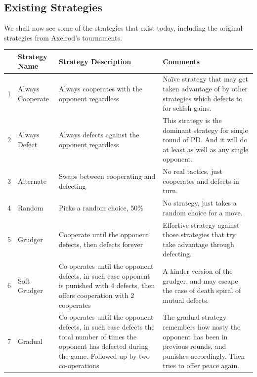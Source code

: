 \documentclass{icldt}
\numberwithin{equation}{section}       %
\begin{document}
\subsection{Existing Strategies}
\label{sect:Existing Strategies}
We shall now see some of the strategies that exist today, including the original strategies from Axelrod's tournaments.
\begin{center}
    \begin{tabular}{ | l | p{2.5cm} | p{4cm} | p{6cm} |}
    \hline
    & \textbf{Strategy Name} & \textbf{Strategy Description} & \textbf{Comments} \\ \hline
    1 & Always Cooperate & Always cooperates with the opponent regardless & Naïve strategy that may get taken advantage of by other strategies which defects to for selfish gains. \\ \hline
    2 & Always Defect	& Always defects against the opponent regardless	& This strategy is the dominant strategy for single round of PD. And it will do at least as well as any single opponent. \\ \hline
    3	& Alternate & Swaps between cooperating and defecting	& No real tactics, just cooperates and defects in turn.\\ \hline
4	& Random	& Picks a random choice, 50\%	& No strategy, just takes a random choice for a move.\\ \hline
5	& Grudger	& Cooperate until the opponent defects, then defects forever	& Effective strategy against those strategies that try take advantage through defecting.\\ \hline
6	& Soft Grudger	& Co-operates until the opponent defects, in such case opponent is punished with 4 defects, then offers cooperation with 2 cooperates	 & A kinder version of the grudger, and may escape the case of death spiral of mutual defects.\\ \hline
7	& Gradual	& Co-operates until the opponent defects, in such case defects the total number of times the opponent has defected during the game. Followed up by two co-operations & The gradual strategy remembers how nasty the opponent has been in previous rounds, and punishes accordingly. Then tries to offer peace again.\\ \hline
\end{tabular}


\end{center}
\end{document}

